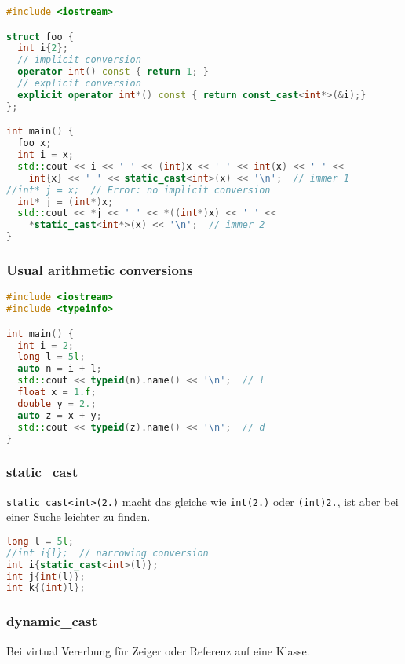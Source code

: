 \begin{lstlisting}[language=C++]
#include <iostream>

struct foo {
  int i{2};
  // implicit conversion
  operator int() const { return 1; }
  // explicit conversion
  explicit operator int*() const { return const_cast<int*>(&i);}
};

int main() {
  foo x;
  int i = x;
  std::cout << i << ' ' << (int)x << ' ' << int(x) << ' ' <<
    int{x} << ' ' << static_cast<int>(x) << '\n';  // immer 1
//int* j = x;  // Error: no implicit conversion
  int* j = (int*)x;
  std::cout << *j << ' ' << *((int*)x) << ' ' <<
    *static_cast<int*>(x) << '\n';  // immer 2
}
\end{lstlisting}

\subsubsection{Usual arithmetic conversions}

\begin{lstlisting}[language=C++]
#include <iostream>
#include <typeinfo>

int main() {
  int i = 2;
  long l = 5l;
  auto n = i + l;
  std::cout << typeid(n).name() << '\n';  // l
  float x = 1.f;
  double y = 2.;
  auto z = x + y;
  std::cout << typeid(z).name() << '\n';  // d
}
\end{lstlisting}

\subsubsection{static\_cast}

\lstinline|static_cast<int>(2.)| macht das gleiche wie \lstinline|int(2.)| oder
\lstinline|(int)2.|, ist aber bei einer Suche leichter zu finden.

\begin{lstlisting}[language=C++]
long l = 5l;
//int i{l};  // narrowing conversion
int i{static_cast<int>(l)};
int j{int(l)};
int k{(int)l};
\end{lstlisting}

\subsubsection{dynamic\_cast}

Bei virtual Vererbung für Zeiger oder Referenz auf eine Klasse.

